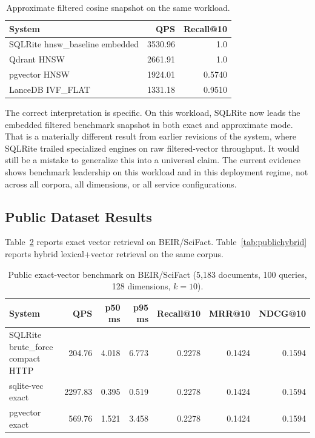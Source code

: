 \documentclass[11pt]{article}
\begin{document}
\begin{table}[H]
  \centering
  \small
  \caption{Approximate filtered cosine snapshot on the same workload.}
  \label{tab:approxsnapshot}
  \begin{tabular}{lrr}
    \toprule
    System & QPS & Recall@10 \\
    \midrule
    SQLRite hnsw\_baseline embedded & 3530.96 & 1.0 \\
    Qdrant HNSW & 2661.91 & 1.0 \\
    pgvector HNSW & 1924.01 & 0.5740 \\
    LanceDB IVF\_FLAT & 1331.18 & 0.9510 \\
    \bottomrule
  \end{tabular}
\end{table}

The correct interpretation is specific. On this workload, SQLRite now leads the embedded filtered benchmark snapshot in both exact and approximate mode. That is a materially different result from earlier revisions of the system, where SQLRite trailed specialized engines on raw filtered-vector throughput. It would still be a mistake to generalize this into a universal claim. The current evidence shows benchmark leadership on this workload and in this deployment regime, not across all corpora, all dimensions, or all service configurations.

\subsection{Public Dataset Results}
Table~\ref{tab:publicexact} reports exact vector retrieval on BEIR/SciFact. Table~\ref{tab:publichybrid} reports hybrid lexical+vector retrieval on the same corpus.

\begin{table}[H]
  \centering
  \small
  \caption{Public exact-vector benchmark on BEIR/SciFact (5,183 documents, 100 queries, 128 dimensions, \(k=10\)).}
  \label{tab:publicexact}
  \begin{tabular}{lrrrrrr}
    \toprule
    System & QPS & p50 ms & p95 ms & Recall@10 & MRR@10 & NDCG@10 \\
    \midrule
    SQLRite brute\_force compact HTTP & 204.76 & 4.018 & 6.773 & 0.2278 & 0.1424 & 0.1594 \\
    sqlite-vec exact & 2297.83 & 0.395 & 0.519 & 0.2278 & 0.1424 & 0.1594 \\
    pgvector exact & 569.76 & 1.521 & 3.458 & 0.2278 & 0.1424 & 0.1594 \\
    \bottomrule
  \end{tabular}
\end{table}
\end{document}
